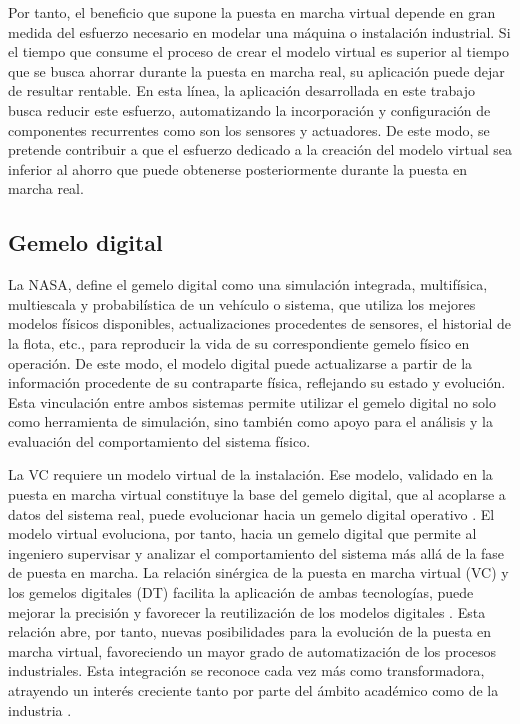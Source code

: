 Por tanto, el beneficio que supone la puesta en marcha virtual depende en gran medida del esfuerzo necesario en modelar una máquina o instalación industrial. Si el tiempo que consume el proceso de crear el modelo virtual es superior al tiempo que se busca ahorrar durante la puesta en marcha real, su aplicación puede dejar de resultar rentable. En esta línea, la aplicación desarrollada en este trabajo busca reducir este esfuerzo, automatizando la incorporación y configuración de componentes recurrentes como son los sensores y actuadores. De este modo, se pretende contribuir a que el esfuerzo dedicado a la creación del modelo virtual sea inferior al ahorro que puede obtenerse posteriormente durante la puesta en marcha real.\\


\subsection{Gemelo digital} \label{subsec:gemelo}

La NASA, \cite{glaessgen2012digitaltwin} define el gemelo digital como una simulación integrada, multifísica, multiescala y probabilística de un vehículo o sistema, que utiliza los mejores modelos físicos disponibles, actualizaciones procedentes de sensores, el historial de la flota, etc., para reproducir la vida de su correspondiente gemelo físico en operación. De este modo, el modelo digital puede actualizarse a partir de la información procedente de su contraparte física, reflejando su estado y evolución. Esta vinculación entre ambos sistemas permite utilizar el gemelo digital no solo como herramienta de simulación, sino también como apoyo para el análisis y la evaluación del comportamiento del sistema físico.

La VC requiere un modelo virtual de la instalación. Ese modelo, validado en la puesta en marcha virtual constituye la base del gemelo digital, que al acoplarse a datos del sistema real, puede evolucionar hacia un gemelo digital operativo . El modelo virtual evoluciona, por tanto, hacia un gemelo digital que permite al ingeniero supervisar y analizar el comportamiento del sistema más allá de la fase de puesta en marcha. La relación sinérgica de la puesta en marcha virtual (VC) y los gemelos digitales (DT) facilita la aplicación de ambas tecnologías, puede mejorar la precisión y favorecer la reutilización de los modelos digitales . Esta relación abre, por tanto, nuevas posibilidades para la evolución de la puesta en marcha virtual, favoreciendo un mayor grado de automatización de los procesos industriales. Esta integración se reconoce cada vez más como transformadora, atrayendo un interés creciente tanto por parte del ámbito académico como de la industria .

